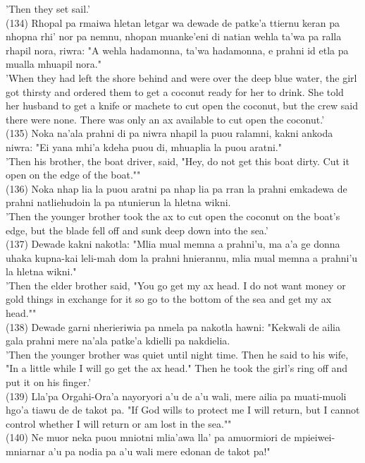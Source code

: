 \documentclass[10pt]{article}
\begin{document}
'Then they set sail.'\\
(134) Rhopal pa rmaiwa hletan letgar wa dewade de patke'a ttiernu keran pa nhopna rhi' nor pa nemnu, nhopan muanke'eni di natian wehla ta'wa pa ralla rhapil nora, riwra: "A wehla hadamonna, ta'wa hadamonna, e prahni id etla pa mualla mhuapil nora."\\
'When they had left the shore behind and were over the deep blue water, the girl got thirsty and ordered them to get a coconut ready for her to drink. She told her husband to get a knife or machete to cut open the coconut, but the crew said there were none. There was only an ax available to cut open the coconut.'\\
(135) Noka na'ala prahni di pa niwra nhapil la puou ralamni, kakni ankoda niwra: "Ei yana mhi'a kdeha puou di, mhuaplia la puou aratni."\\
'Then his brother, the boat driver, said, "Hey, do not get this boat dirty. Cut it open on the edge of the boat.""\\
(136) Noka nhap lia la puou aratni pa nhap lia pa rran la prahni emkadewa de prahni natliehudoin la pa ntunierun la hletna wikni.\\
'Then the younger brother took the ax to cut open the coconut on the boat's edge, but the blade fell off and sunk deep down into the sea.'\\
(137) Dewade kakni nakotla: "Mlia mual memna a prahni'u, ma a'a ge donna uhaka kupna-kai leli-mah dom la prahni hnierannu, mlia mual memna a prahni'u la hletna wikni."\\
'Then the elder brother said, "You go get my ax head. I do not want money or gold things in exchange for it so go to the bottom of the sea and get my ax head.""\\
(138) Dewade garni nherieriwia pa nmela pa nakotla hawni: "Kekwali de ailia gala prahni mere na'ala patke'a kdielli pa nakdielia.\\
'Then the younger brother was quiet until night time. Then he said to his wife, "In a little while I will go get the ax head." Then he took the girl's ring off and put it on his finger.'\\
(139) Lla'pa Orgahi-Ora'a nayoryori a'u de a'u wali, mere ailia pa muati-muoli hgo'a tiawu de de takot pa. "If God wills to protect me I will return, but I cannot control whether I will return or am lost in the sea.""\\
(140) Ne muor neka puou mniotni mlia'awa lla' pa amuormiori de mpieiwei-mniarnar a'u pa nodia pa a'u wali mere edonan de takot pa!"\\
\end{document}
